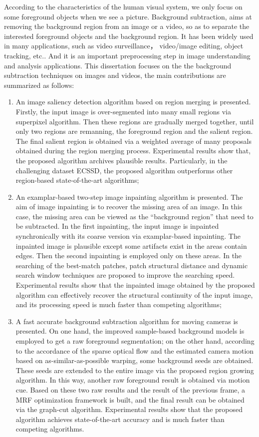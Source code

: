 \begin{eabstract}
   According to the characteristics of the human visual system, we only focus on some foreground objects when we see a picture. Background subtraction, aims at removing the background region from an image or a video, so as to separate the interested foreground objects and the background region. It has been widely used in many applications, such as video surveillance， video/image editing, object tracking, etc.. And it is an important preprocessing step in image  understanding and analysis applications. This dissertation focuses on the the background subtraction techniques on images and videos, the main contributions are summarized as follows:
   \begin{enumerate}
   \item An image saliency detection algorithm based on region merging is presented. Firstly, the input image is over-segmented into many small regions via superpixel algorithm. Then these regions are gradually merged together, until only two regions are remanning, the foreground region and the salient region. The final salient region is obtained via a weighted average of many proposals obtained during the region merging process. Experimental results show that, the proposed algorithm archives plausible results. Particularly, in the challenging dataset ECSSD, the proposed algorithm outperforms other region-based state-of-the-art algorithms;
   \item An examplar-based two-step image inpainting algorithm is presented. The aim of image inpainting is to recover the missing area of an image. In this case, the missing area can be viewed as the ``background region''  that need to be subtracted. In the first inpainting, the input image is inpainted synchronically with its coarse version via examplar-based inpainting. The inpainted image is plausible except some artifacts exist in the areas contain edges. Then the second inpainting is employed only on these areas. In the searching of the best-match patches, patch structural distance and dynamic search window techniques are proposed to improve the searching speed. Experimental results show that the inpainted image obtained by the proposed algorithm can effectively recover the structural continuity of the input image, and its processing speed is much faster than competing algorithms;
   \item A fast accurate background subtraction algorithm for moving cameras is presented. On one hand, the improved sample-based background models is employed to get a raw foreground segmentation; on the other hand, according to the accordance of the sparse optical flow and the estimated camera motion based on as-similar-as-possible warping, some background seeds are obtained. These seeds are extended to the entire image via the proposed region growing algorithm. In this way, another raw foreground result is obtained via motion cue. Based on these two raw results and the result of the previous frame, a MRF optimization framework is built, and the final result can be obtained via the graph-cut algorithm. Experimental results show that the proposed algorithm achieves state-of-the-art accuracy and is much faster than competing algorithms.


\end{enumerate}
\end{eabstract}
